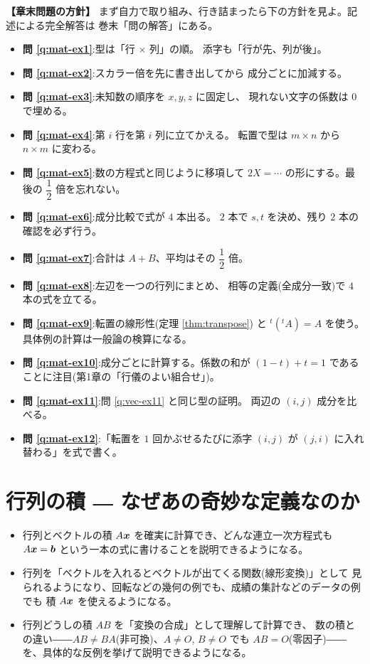 \bigskip
{\small
\noindent\textbf{【章末問題の方針】}\quad
まず自力で取り組み、行き詰まったら下の方針を見よ。記述による完全解答は
巻末「問の解答」にある。
\begin{itemize}
\item \textbf{問 \ref{q:mat-ex1}}:型は「行 $\times$ 列」の順。
添字も「行が先、列が後」。
\item \textbf{問 \ref{q:mat-ex2}}:スカラー倍を先に書き出してから
成分ごとに加減する。
\item \textbf{問 \ref{q:mat-ex3}}:未知数の順序を $x, y, z$ に固定し、
現れない文字の係数は $0$ で埋める。
\item \textbf{問 \ref{q:mat-ex4}}:第 $i$ 行を第 $i$ 列に立てかえる。
転置で型は $m \times n$ から $n \times m$ に変わる。
\item \textbf{問 \ref{q:mat-ex5}}:数の方程式と同じように移項して
$2X = \cdots$ の形にする。最後の $\dfrac{1}{2}$ 倍を忘れない。
\item \textbf{問 \ref{q:mat-ex6}}:成分比較で式が $4$ 本出る。
$2$ 本で $s, t$ を決め、残り $2$ 本の確認を必ず行う。
\item \textbf{問 \ref{q:mat-ex7}}:合計は $A + B$、平均はその
$\dfrac{1}{2}$ 倍。
\item \textbf{問 \ref{q:mat-ex8}}:左辺を一つの行列にまとめ、
相等の定義(全成分一致)で $4$ 本の式を立てる。
\item \textbf{問 \ref{q:mat-ex9}}:転置の線形性(定理 \ref{thm:transpose})
と ${}^t({}^t\!A) = A$ を使う。具体例の計算は一般論の検算になる。
\item \textbf{問 \ref{q:mat-ex10}}:成分ごとに計算する。係数の和が
$(1 - t) + t = 1$ であることに注目(第1章の「行儀のよい組合せ」)。
\item \textbf{問 \ref{q:mat-ex11}}:問 \ref{q:vec-ex11} と同じ型の証明。
両辺の $(i,j)$ 成分を比べる。
\item \textbf{問 \ref{q:mat-ex12}}:「転置を $1$ 回かぶせるたびに添字
$(i,j)$ が $(j,i)$ に入れ替わる」を式で書く。
\end{itemize}
}

\chapter{行列の積 ― なぜあの奇妙な定義なのか}\label{chap:matmul}

\begin{goal}
\begin{itemize}
\item 行列とベクトルの積 $A\bm{x}$ を確実に計算でき、どんな連立一次方程式も
$A\bm{x} = \bm{b}$ という一本の式に書けることを説明できるようになる。
\item 行列を「ベクトルを入れるとベクトルが出てくる関数(線形変換)」として
見られるようになり、回転などの幾何の例でも、成績の集計などのデータの例でも
積 $A\bm{x}$ を使えるようになる。
\item 行列どうしの積 $AB$ を「変換の合成」として理解して計算でき、
数の積との違い――$AB \neq BA$(非可換)、$A \neq O$, $B \neq O$ でも
$AB = O$(零因子)――を、具体的な反例を挙げて説明できるようになる。
\end{itemize}
\end{goal}

